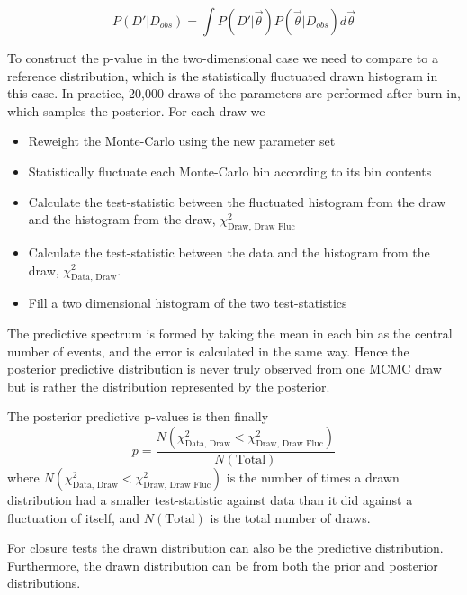 \begin{equation}
P(D'|D_{obs}) = \int P(D'|\vec{\theta}) P(\vec{\theta}|D_{obs}) d\vec{\theta}
\end{equation}

To construct the p-value in the two-dimensional case we need to compare to a reference distribution, which is the statistically fluctuated drawn histogram in this case. In practice, 20,000 draws of the parameters are performed after burn-in, which samples the posterior. For each draw we
\begin{itemize}
	\item Reweight the Monte-Carlo using the new parameter set
	\item Statistically fluctuate each Monte-Carlo bin according to its bin contents
	\item Calculate the test-statistic between the fluctuated histogram from the draw and the histogram from the draw, $\chi^2_{\text{Draw, Draw Fluc}}$
	\item Calculate the test-statistic between the data and the histogram from the draw, $\chi^2_{\text{Data, Draw}}$.
	\item Fill a two dimensional histogram of the two test-statistics
\end{itemize}
The predictive spectrum is formed by taking the mean in each bin as the central number of events, and the error is calculated in the same way. Hence the posterior predictive distribution is never truly observed from one MCMC draw but is rather the distribution represented by the posterior.

The posterior predictive p-values is then finally
\begin{equation}
p = \frac{N\left(\chi^2_{\text{Data, Draw}} < \chi^2_{\text{Draw, Draw Fluc}}\right)}{N\left(\text{Total}\right)}
\end{equation}
where $N\left(\chi^2_{\text{Data, Draw}} < \chi^2_{\text{Draw, Draw Fluc}}\right)$ is the number of times a drawn distribution had a smaller test-statistic against data than it did against a fluctuation of itself, and $N(\text{Total})$ is the total number of draws.

For closure tests the drawn distribution can also be the predictive distribution. Furthermore, the drawn distribution can be from both the prior and posterior distributions.


